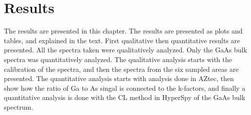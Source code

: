 \chapter{Results}
\label{chap:results}




The results are presented in this chapter.
The results are presented as plots and tables, and explained in the text.
First qualitative then quantitative results are presented.
All the spectra taken were qualitatively analyzed.
Only the GaAs bulk spectra was quantitatively analyzed.
The qualitative analysis starts with the calibration of the spectra, and then the spectra from the six sampled areas are presented.
The quantitative analysis starts with analysis done in AZtec, then show how the ratio of Ga to As singal is connected to the k-factors, and finally a quantitative analysis is done with the CL method in HyperSpy of the GaAs bulk spectrum.










